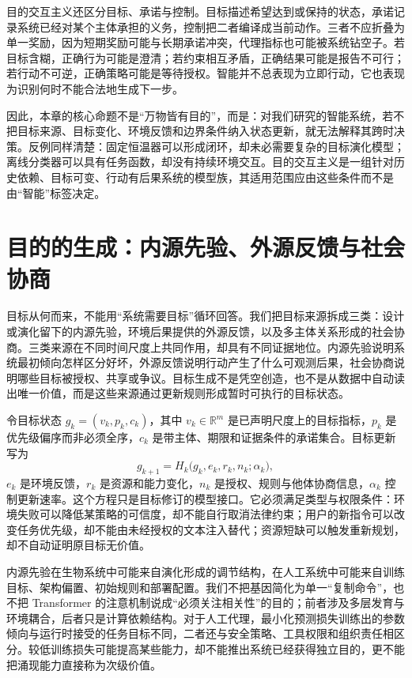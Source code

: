 目的交互主义还区分目标、承诺与控制。目标描述希望达到或保持的状态，承诺记录系统已经对某个主体承担的义务，控制把二者编译成当前动作。三者不应折叠为单一奖励，因为短期奖励可能与长期承诺冲突，代理指标也可能被系统钻空子。若目标含糊，正确行为可能是澄清；若约束相互矛盾，正确结果可能是报告不可行；若行动不可逆，正确策略可能是等待授权。智能并不总表现为立即行动，它也表现为识别何时不能合法地生成下一步。

因此，本章的核心命题不是“万物皆有目的”，而是：对我们研究的智能系统，若不把目标来源、目标变化、环境反馈和边界条件纳入状态更新，就无法解释其跨时决策。反例同样清楚：固定恒温器可以形成闭环，却未必需要复杂的目标演化模型；离线分类器可以具有任务函数，却没有持续环境交互。目的交互主义是一组针对历史依赖、目标可变、行动有后果系统的模型族，其适用范围应由这些条件而不是由“智能”标签决定。

\section{目的的生成：内源先验、外源反馈与社会协商}
\label{sec:section_7643}

目标从何而来，不能用“系统需要目标”循环回答。我们把目标来源拆成三类：设计或演化留下的内源先验，环境后果提供的外源反馈，以及多主体关系形成的社会协商。三类来源在不同时间尺度上共同作用，却具有不同证据地位。内源先验说明系统最初倾向怎样区分好坏，外源反馈说明行动产生了什么可观测后果，社会协商说明哪些目标被授权、共享或争议。目标生成不是凭空创造，也不是从数据中自动读出唯一价值，而是这些来源通过更新规则形成暂时可执行的目标状态。

令目标状态 $g_k=(v_k,p_k,c_k)$，其中 $v_k\in\mathbb R^m$ 是已声明尺度上的目标指标，$p_k$ 是优先级偏序而非必须全序，$c_k$ 是带主体、期限和证据条件的承诺集合。目标更新写为
\begin{equation}
  g_{k+1}=H_k\bigl(g_k,e_k,r_k,n_k;\alpha_k\bigr),
\end{equation}
$e_k$ 是环境反馈，$r_k$ 是资源和能力变化，$n_k$ 是授权、规则与他体协商信息，$\alpha_k$ 控制更新速率。这个方程只是目标修订的模型接口。它必须满足类型与权限条件：环境失败可以降低某策略的可信度，却不能自行取消法律约束；用户的新指令可以改变任务优先级，却不能由未经授权的文本注入替代；资源短缺可以触发重新规划，却不自动证明原目标无价值。

内源先验在生物系统中可能来自演化形成的调节结构，在人工系统中可能来自训练目标、架构偏置、初始规则和部署配置。我们不把基因简化为单一“复制命令”，也不把 Transformer 的注意机制说成“必须关注相关性”的目的；前者涉及多层发育与环境耦合，后者只是计算依赖结构。对于人工代理，最小化预测损失训练出的参数倾向与运行时接受的任务目标不同，二者还与安全策略、工具权限和组织责任相区分。较低训练损失可能提高某些能力，却不能推出系统已经获得独立目的，更不能把涌现能力直接称为次级价值。

